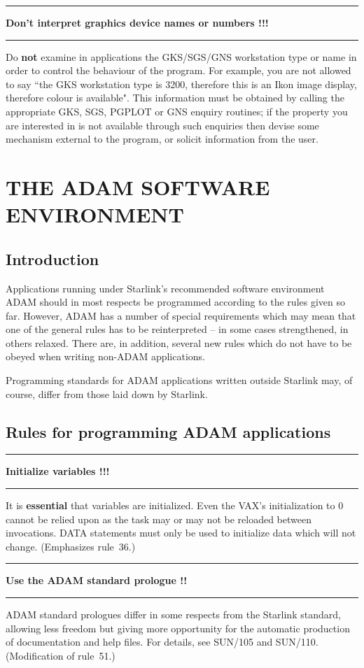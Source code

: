 \documentclass[twoside,11pt,nolof,noabs]{starlink}
\newcounter{sruleno}
\providecommand{\srule}[1]{
    \addtocounter{sruleno}{1}
    \goodbreak
    \rule{\textwidth}{0.3mm}
    \textbf{#1} \scpushright{ \textbf{\thesruleno}}
    \rule{\textwidth}{0.1mm}
}
\renewcommand{\_}{{\tt\char'137}}
\begin{document}
\srule{Don't interpret graphics device names or numbers !!!}
Do \textbf{not} examine in applications the GKS/SGS/GNS workstation
type or name in order to control the behaviour of the
program.  For example, you are not allowed to say ``the
GKS workstation type is 3200, therefore this is an
Ikon image display, therefore colour is available".  This
information must be obtained by calling the appropriate
GKS, SGS, \mbox{PGPLOT} or GNS enquiry routines;  if the property
you are interested in is not available through such
enquiries then devise some mechanism external to the
program, or solicit information from the user.

\newpage
\section{THE ADAM SOFTWARE ENVIRONMENT}

\subsection{Introduction}
Applications running under Starlink's recommended software
environment ADAM should in most respects be programmed
according to the rules given so far.  However, ADAM has a number
of special requirements which may mean that one of the
general rules has to be reinterpreted -- in some cases
strengthened, in others relaxed.  There are, in addition,
several new rules which do not have to be obeyed when
writing non-ADAM applications.

Programming standards for ADAM applications written outside
Starlink may, of course, differ from those laid down by Starlink.

\goodbreak
\subsection{Rules for programming ADAM applications}

\srule{Initialize variables !!!}
It is \textbf{essential} that variables are initialized.
Even the VAX's initialization to 0 cannot be relied upon as the task may or
may not be reloaded between invocations.
DATA statements must only be used to initialize data which will not change.
(Emphasizes rule~36.)

\srule{Use the ADAM standard prologue !!}
ADAM standard prologues differ in some respects from the Starlink
standard, allowing less freedom but giving more opportunity for
the automatic production of documentation and help files.
For details, see SUN/105 and SUN/110.
(Modification of rule~51.)
\end{document}
